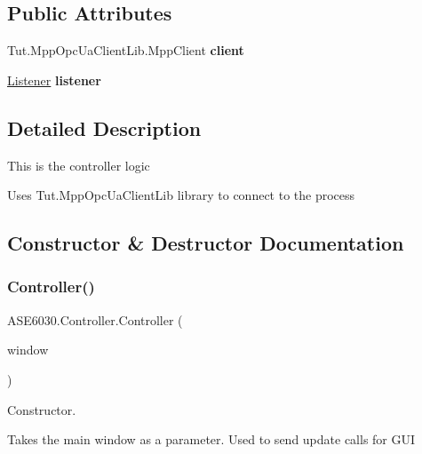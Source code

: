 \subsection*{Public Attributes}
\begin{DoxyCompactItemize}
\item 
\mbox{\label{class_a_s_e6030_1_1_controller_a36785106c3f4bc54402290b0d86911fc}} 
Tut.\+Mpp\+Opc\+Ua\+Client\+Lib.\+Mpp\+Client {\bfseries client}
\item 
\mbox{\label{class_a_s_e6030_1_1_controller_a8cc31711b16a81099afb9ad6125d1d0f}} 
\hyperlink{class_a_s_e6030_1_1_listener}{Listener} {\bfseries listener}
\end{DoxyCompactItemize}


\subsection{Detailed Description}
This is the controller logic 

Uses Tut.\+Mpp\+Opc\+Ua\+Client\+Lib library to connect to the process 

\subsection{Constructor \& Destructor Documentation}
\mbox{\label{class_a_s_e6030_1_1_controller_aa7df468c34d983c6efe88f12abeffb79}} 
\subsubsection{\texorpdfstring{Controller()}{Controller()}}
{\footnotesize\ttfamily A\+S\+E6030.\+Controller.\+Controller (\begin{DoxyParamCaption}\item[{\hyperlink{class_a_s_e6030_1_1_main_window}{Main\+Window}}]{window }\end{DoxyParamCaption})\hspace{0.3cm}{\ttfamily [inline]}}



Constructor. 

Takes the main window as a parameter. Used to send update calls for G\+UI 

